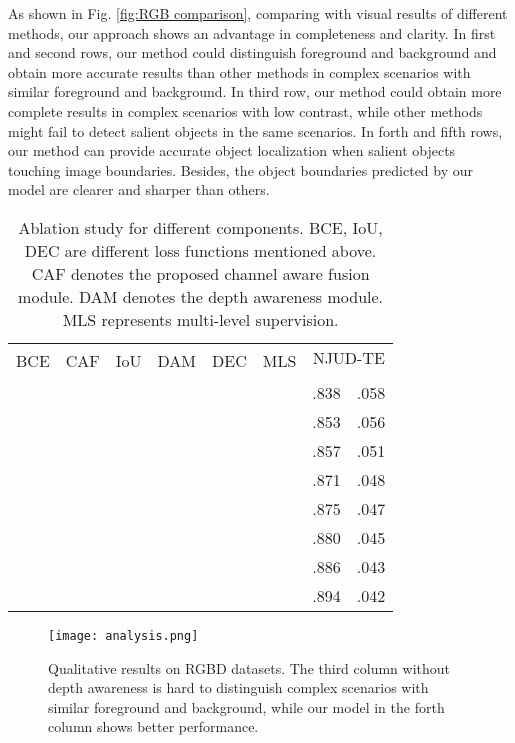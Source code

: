\documentclass[sigconf]{acmart}
\newcommand{\figref}[1]{Fig. \ref{#1}}
\begin{document}
As shown in \figref{fig:RGB comparison}, comparing with visual results of different methods, our approach shows an advantage in completeness and clarity. In first and second rows, our method could distinguish foreground and background and obtain more accurate results than other methods in complex scenarios with similar foreground and background. In third row, our method could obtain more complete results in complex scenarios with low contrast, while other methods might fail to detect salient objects in the same scenarios. In forth and fifth rows, our method can provide accurate object localization when salient objects touching image boundaries. Besides, the object boundaries predicted by our model are clearer and sharper than others.


\begin{table}[t] 
	\caption{Ablation study for different components. BCE, IoU, DEC are different loss functions mentioned above. CAF denotes the proposed channel aware fusion module. DAM denotes the depth awareness module. MLS represents multi-level supervision. }
	\label{table:ablation}
	\begin{tabular}{cccccc|cc}
		\hline
		\multirow{2}{*}{BCE} & \multirow{2}{*}{CAF} & \multirow{2}{*}{IoU} & \multirow{2}{*}{DAM} & \multirow{2}{*}{DEC} & \multirow{2}{*}{MLS} & \multicolumn{2}{c}{NJUD-TE} \\
		&   &   &   &   &   &     &   \\ \hline
		\checkmark &   &   &   &   &   & .838 & .058 \\
		\checkmark & \checkmark &   &   &   &   & .853 & .056 \\
		\checkmark & \checkmark &   & \checkmark &   &   & .857 & .051 \\
		\checkmark & \checkmark &   & \checkmark & \checkmark &   & .871 & .048 \\ \hline
		\checkmark & \checkmark & \checkmark &   &   &   & .875 & .047 \\
		\checkmark & \checkmark & \checkmark & \checkmark &   &   & .880 & .045 \\
		\checkmark & \checkmark & \checkmark & \checkmark & \checkmark &   & .886 & .043 \\
		\checkmark & \checkmark & \checkmark & \checkmark & \checkmark & \checkmark & .894 & .042 \\ \hline
	\end{tabular}
\end{table}

\begin{figure}[t]
	\begin{center}
\texttt{[image: analysis.png]}
		\caption{Qualitative results on RGBD datasets. The third column without depth awareness is hard to distinguish complex scenarios with similar foreground and background, while our model in the forth column shows better performance.
		}\label{fig:analysis}
	\end{center}
\end{figure}
\end{document}
